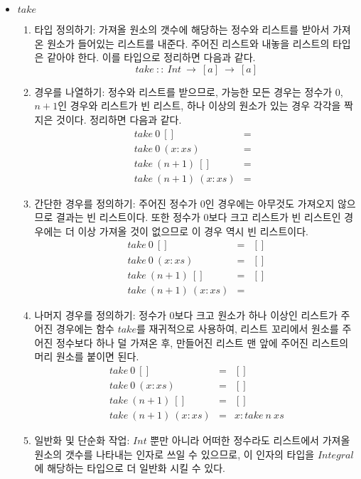 \begin{itemize}
\item $take$
  \begin{enumerate}
  \item 타입 정의하기: 가져올 원소의 갯수에 해당하는 정수와 리스트를 받아서
    가져온 원소가 들어있는 리스트를 내준다. 주어진 리스트와 내놓을
    리스트의 타입은 같아야 한다. 이를 타입으로 정리하면 다음과 같다.
    \[take~::~Int~\rightarrow~[a]~\rightarrow~[a]\]
  \item 경우를 나열하기: 정수와 리스트를 받으므로, 가능한 모든 경우는 정수가
    $0$,$n+1$인 경우와 리스트가 빈 리스트, 하나 이상의 원소가 있는 경우
    각각을 짝지은 것이다. 정리하면 다음과 같다.
    \[\begin{array}{lcl}
      take~0~[]           & = & \\
      take~0~(x : xs)     & = & \\
      take~(n+1)~[]       & = & \\
      take~(n+1)~(x : xs) & = &
    \end{array}\]
  \item 간단한 경우를 정의하기: 주어진 정수가 0인 경우에는 아무것도 가져오지
    않으므로 결과는 빈 리스트이다. 또한 정수가 0보다 크고 리스트가 빈 리스트인
    경우에는 더 이상 가져올 것이 없으므로 이 경우 역시 빈 리스트이다.
    \[\begin{array}{lcl}
      take~0~[]           & = & [] \\
      take~0~(x : xs)     & = & [] \\
      take~(n+1)~[]       & = & [] \\
      take~(n+1)~(x : xs) & = &
    \end{array}\]
  \item 나머지 경우를 정의하기: 정수가 0보다 크고 원소가 하나 이상인 리스트가
    주어진 경우에는 함수 $take$를 재귀적으로 사용하여, 리스트 꼬리에서 원소를
    주어진 정수보다 하나 덜 가져온 후, 만들어진 리스트 맨 앞에 주어진 리스트의
    머리 원소를 붙이면 된다.
    \[\begin{array}{lcl}
      take~0~[]           & = & [] \\
      take~0~(x : xs)     & = & [] \\
      take~(n+1)~[]       & = & [] \\
      take~(n+1)~(x : xs) & = & x : take~n~xs
    \end{array}\]
  \item 일반화 및 단순화 작업: $Int$ 뿐만 아니라 어떠한 정수라도 리스트에서
    가져올 원소의 갯수를 나타내는 인자로 쓰일 수 있으므로, 이 인자의 타입을
    $Integral$에 해당하는 타입으로 더 일반화 시킬 수 있다.

\end{enumerate}
\end{itemize}
